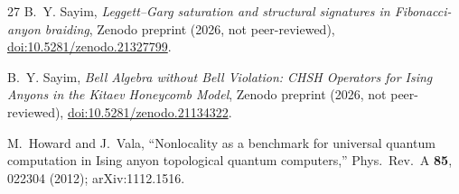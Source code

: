 \documentclass[aps,pra,twocolumn,superscriptaddress,showpacs,floatfix]{revtex4-2}
\begin{document}
\begin{thebibliography}{27}
B.~Y. Sayim,
\emph{Leggett--Garg saturation and structural signatures in Fibonacci-anyon braiding},
Zenodo preprint (2026, not peer-reviewed),
\href{https://doi.org/10.5281/zenodo.21327799}{doi:10.5281/zenodo.21327799}.

B.~Y. Sayim,
\emph{Bell Algebra without Bell Violation: CHSH Operators for Ising Anyons
in the Kitaev Honeycomb Model},
Zenodo preprint (2026, not peer-reviewed),
\href{https://doi.org/10.5281/zenodo.21134322}{doi:10.5281/zenodo.21134322}.

M.~Howard and J.~Vala,
``Nonlocality as a benchmark for universal quantum computation in Ising anyon topological quantum computers,''
Phys.\ Rev.\ A \textbf{85}, 022304 (2012);
arXiv:1112.1516.

\end{thebibliography}
\end{document}
